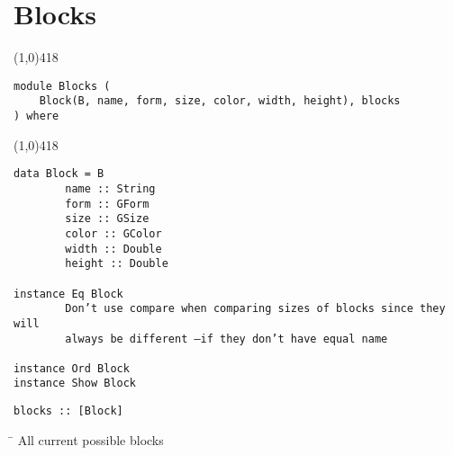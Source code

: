 \section{Blocks}
\begin{center}
\line(1,0){418}
\end{center}
\begin{verbatim}
module Blocks (
    Block(B, name, form, size, color, width, height), blocks
) where
\end{verbatim}
\begin{center}
\line(1,0){418}
\end{center}
\begin{verbatim}
data Block = B
        name :: String
        form :: GForm
        size :: GSize
        color :: GColor
        width :: Double
        height :: Double

instance Eq Block
        Don’t use compare when comparing sizes of blocks since they will 
        always be different —if they don’t have equal name

instance Ord Block
instance Show Block
\end{verbatim}
\begin{verbatim}
blocks :: [Block]
\end{verbatim}
\begin{tabbing}
\hspace*{1cm}\= \kill
\> All current possible blocks
\end{tabbing}
